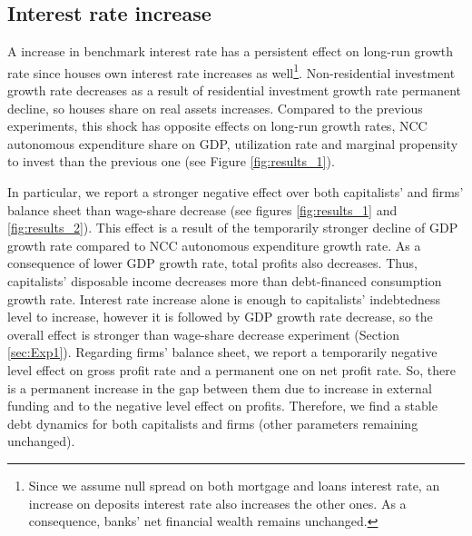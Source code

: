 \documentclass[12pt]{article}
\begin{document}
\subsection{Interest rate increase}
\label{sec:org2d667cf}
\label{sec:Exp3}

A increase in benchmark interest rate  has a persistent effect on long-run growth rate since houses own interest rate increases as well\footnote{Since we assume null spread on both mortgage and loans interest rate, an increase on deposits interest rate also increases the other ones. As a consequence, banks' net financial wealth remains unchanged.}.
Non-residential investment growth rate decreases as a result of residential investment growth rate permanent decline, so houses share on real assets increases.
Compared to the previous experiments, this shock has opposite effects on long-run growth rates, NCC autonomous expenditure share on GDP, utilization rate and marginal propensity to invest  than the previous one (see Figure \ref{fig:results_1}).


In particular, we report a stronger negative effect over both capitalists' and firms' balance sheet than wage-share decrease (see figures \ref{fig:results_1} and \ref{fig:results_2}).
This effect is a result of the temporarily stronger decline of GDP growth rate compared to NCC autonomous expenditure growth rate.
As a consequence of lower GDP growth rate, total profits also decreases.
Thus, capitalists' disposable income decreases more than debt-financed consumption growth rate.
Interest rate increase alone is enough to capitalists' indebtedness level to increase, however it is followed by GDP growth rate decrease, so the overall effect is stronger than wage-share decrease experiment (Section \ref{sec:Exp1}).
Regarding firms' balance sheet, we report a temporarily negative level effect on gross profit rate and a permanent one on net profit rate. 
So, there is a permanent increase in the gap between them due to increase in external funding and to the negative level effect on profits.
Therefore, we find a stable debt dynamics for both capitalists and firms (other parameters remaining unchanged).
\end{document}
